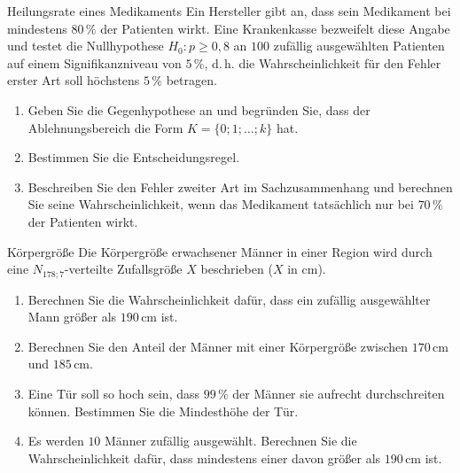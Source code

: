 \begin{uebung}{Heilungsrate eines Medikaments}
Ein Hersteller gibt an, dass sein Medikament bei mindestens $80\,\%$ der Patienten wirkt. Eine Krankenkasse bezweifelt diese Angabe und testet die Nullhypothese $H_0: p\geq 0{,}8$ an $100$ zufällig ausgewählten Patienten auf einem Signifikanzniveau von $5\,\%$, d.\,h. die Wahrscheinlichkeit für den Fehler erster Art soll höchstens $5\,\%$ betragen.
\begin{enumerate}[label=\alph*)]
  \item Geben Sie die Gegenhypothese an und begründen Sie, dass der Ablehnungsbereich die Form $K = \{0;1;\ldots;k\}$ hat.
  \item Bestimmen Sie die Entscheidungsregel.
  \item Beschreiben Sie den Fehler zweiter Art im Sachzusammenhang und berechnen Sie seine Wahrscheinlichkeit, wenn das Medikament tatsächlich nur bei $70\,\%$ der Patienten wirkt.
\end{enumerate}
\end{uebung}

\begin{uebung}{Körpergröße}
Die Körpergröße erwachsener Männer in einer Region wird durch eine $N_{178;7}$-verteilte Zufallsgröße $X$ beschrieben ($X$ in cm).
\begin{enumerate}[label=\alph*)]
  \item Berechnen Sie die Wahrscheinlichkeit dafür, dass ein zufällig ausgewählter Mann größer als $190\,\text{cm}$ ist.
  \item Berechnen Sie den Anteil der Männer mit einer Körpergröße zwischen $170\,\text{cm}$ und $185\,\text{cm}$.
  \item Eine Tür soll so hoch sein, dass $99\,\%$ der Männer sie aufrecht durchschreiten können. Bestimmen Sie die Mindesthöhe der Tür.
  \item Es werden $10$ Männer zufällig ausgewählt. Berechnen Sie die Wahrscheinlichkeit dafür, dass mindestens einer davon größer als $190\,\text{cm}$ ist.
\end{enumerate}
\end{uebung}

